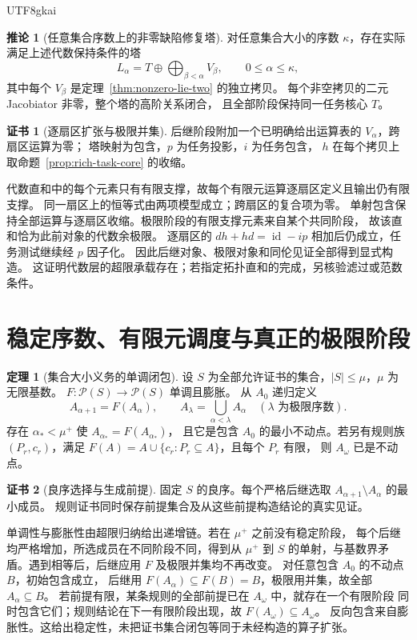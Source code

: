 \documentclass[12pt]{report}
\makeatletter
\theoremstyle{definition}
\newtheorem{theorem}{定理}[chapter]
\newtheorem{corollary}{推论}[chapter]
\newtheorem{Certificate}{证书}[chapter]
\renewenvironment{proof}[1][\proofname]{\par
  \pushQED{\qed}\normalfont
  \topsep6\p@\@plus6\p@\relax
  \trivlist
  \item[\hskip\labelsep\normalfont #1\@addpunct{.}]\ignorespaces
}{
  \popQED\endtrivlist\@endpefalse
}
\newcommand{\id}{\operatorname{id}}
\makeatother
\begin{document}
\begin{CJK*}{UTF8}{gkai}
\begin{corollary}[任意集合序数上的非零缺陷修复塔]
\label{cor:transfinite-realization}
对任意集合大小的序数 \(\kappa\)，存在实际满足上述代数保持条件的塔
\[
L_\alpha=T\oplus\bigoplus_{\beta<\alpha}V_\beta,
\qquad 0\le\alpha\le\kappa,
\]
其中每个 \(V_\beta\) 是定理~\ref{thm:nonzero-lie-two} 的独立拷贝。
每个非空拷贝的二元 Jacobiator 非零，整个塔的高阶关系闭合，
且全部阶段保持同一任务核心 \(T\)。
\end{corollary}
\begin{Certificate}[逐扇区扩张与极限并集]
后继阶段附加一个已明确给出运算表的 \(V_\alpha\)，跨扇区运算为零；
塔映射为包含，\(p\) 为任务投影，\(i\) 为任务包含，
\(h\) 在每个拷贝上取命题~\ref{prop:rich-task-core} 的收缩。
\end{Certificate}
\begin{proof}
代数直和中的每个元素只有有限支撑，故每个有限元运算逐扇区定义且输出仍有限支撑。
同一扇区上的恒等式由两项模型成立；跨扇区的复合项为零。
单射包含保持全部运算与逐扇区收缩。极限阶段的有限支撑元素来自某个共同阶段，
故该直和恰为此前对象的代数余极限。
逐扇区的 \(dh+hd=\id-ip\) 相加后仍成立，任务测试继续经 \(p\) 因子化。
因此后继对象、极限对象和同伦见证全部得到显式构造。
这证明代数层的超限承载存在；若指定拓扑直和的完成，另核验滤过或范数条件。
\end{proof}

\section{稳定序数、有限元调度与真正的极限阶段}
\begin{theorem}[集合大小义务的单调闭包]
\label{thm:ordinal-saturation}
设 \(S\) 为全部允许证书的集合，\(|S|\le\mu\)，\(\mu\) 为无限基数。
\(F:\mathcal P(S)\to\mathcal P(S)\) 单调且膨胀。
从 \(A_0\) 递归定义
\[
A_{\alpha+1}=F(A_\alpha),\qquad
A_\lambda=\bigcup_{\alpha<\lambda}A_\alpha
\quad(\lambda\text{ 为极限序数}).
\]
存在 \(\alpha_*<\mu^+\) 使 \(A_{\alpha_*}=F(A_{\alpha_*})\)，
且它是包含 \(A_0\) 的最小不动点。若另有规则族 \((P_r,c_r)\)，满足
\(F(A)=A\cup\{c_r:P_r\subseteq A\}\)，且每个 \(P_r\) 有限，
则 \(A_\omega\) 已是不动点。
\end{theorem}
\begin{Certificate}[良序选择与生成前提]
固定 \(S\) 的良序。每个严格后继选取
\(A_{\alpha+1}\setminus A_\alpha\) 的最小成员。
规则证书同时保存前提集合及从这些前提构造结论的真实见证。
\end{Certificate}
\begin{proof}
单调性与膨胀性由超限归纳给出递增链。若在 \(\mu^+\) 之前没有稳定阶段，
每个后继均严格增加，所选成员在不同阶段不同，得到从 \(\mu^+\) 到
\(S\) 的单射，与基数界矛盾。遇到相等后，后继应用 \(F\) 及极限并集均不再改变。
对任意包含 \(A_0\) 的不动点 \(B\)，初始包含成立，
后继用 \(F(A_\alpha)\subseteq F(B)=B\)，极限用并集，故全部 \(A_\alpha\subseteq B\)。
若前提有限，某条规则的全部前提已在 \(A_\omega\) 中，就存在一个有限阶段
同时包含它们；规则结论在下一有限阶段出现，故 \(F(A_\omega)\subseteq A_\omega\)。
反向包含来自膨胀性。这给出稳定性，未把证书集合闭包等同于未经构造的算子扩张。
\end{proof}


\end{CJK*}
\end{document}
